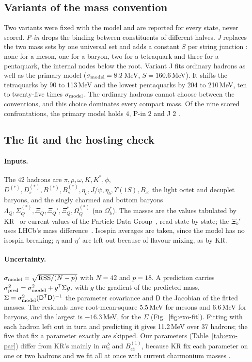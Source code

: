 \subsection{Variants of the mass convention}\label{app:exotics-variants}

Two variants were fixed with the model and are reported for every state, never scored. \emph{P-in} drops the binding between constituents
of different halves. \emph{J} replaces the two mass sets by one universal set and adds a constant $S$ per string junction
\cite{karliner2017,karliner2017a}: none for a meson, one for a baryon, two for a tetraquark and three for a pentaquark, the internal
nodes below the root. Variant J fits ordinary hadrons as well as the primary model ($\sigma_{\rm model}=8.2$\,MeV, $S=160.6$\,MeV). It
shifts the tetraquarks by 90 to 113\,MeV and the lowest pentaquarks by 204 to 210\,MeV, ten to twenty-five times $\sigma_{\rm model}$.
The ordinary hadrons cannot choose between the conventions, and this choice dominates every compact mass. Of the nine scored
confrontations, the primary model holds 4, P-in 2 and J 2 .

\subsection{The fit and the hosting check}\label{app:exotics-fit}

\paragraph{Inputs.} The 42 hadrons are $\pi,\rho,\omega,K,K^*,\phi$, $D^{(*)},D_s^{(*)},B^{(*)},B_s^{(*)},\eta_c,J/\psi,\eta_b,\Upsilon(1S),B_c$,
the light octet and decuplet baryons, and the singly charmed and bottom baryons $\Lambda_Q,\Sigma_Q^{(*)},\Xi_Q,\Xi_Q',\Xi_Q^*,
\Omega_Q^{(*)}$ (no $\Omega_b^*$). The masses are the values tabulated by KR~\cite{karliner2014} or current values of the Particle Data
Group~\cite{navas2024}, read state by state; the $\Xi_b'$ uses LHCb's mass difference~\cite{lhcb2015h}. Isospin averages are taken, since
the model has no isospin breaking; $\eta$ and $\eta'$ are left out because of flavour mixing, as by KR.

\paragraph{Uncertainty.} $\sigma_{\rm model}=\sqrt{\mathrm{RSS}/(N-p)}$ with $N=42$ and $p=18$. A prediction carries
$\sigma_{\rm pred}^2=\sigma_{\rm model}^2+g^{\mathsf T}\Sigma g$, with $g$ the gradient of the predicted mass,
$\Sigma=\sigma_{\rm model}^2(\mathsf D^{\mathsf T}\mathsf D)^{-1}$ the parameter covariance and $\mathsf D$ the Jacobian of the fitted
masses. The residuals have root-mean-square 5.5\,MeV for mesons and 6.6\,MeV for baryons, and the largest is $-16.3$\,MeV, for the
$\Sigma$ (Fig.~\ref{fig:exo-fit}). Fitting with each hadron left out in turn and predicting it gives 11.2\,MeV over 37 hadrons; the five
that fix a parameter exactly are skipped. Our parameters (Table~\ref{tab:exo-par}) differ from KR's mainly in $m^b_c$ and
$B^{(1)}_{c\bar c}$, because KR fix each parameter on one or two hadrons and we fit all at once with current charmonium masses
.


